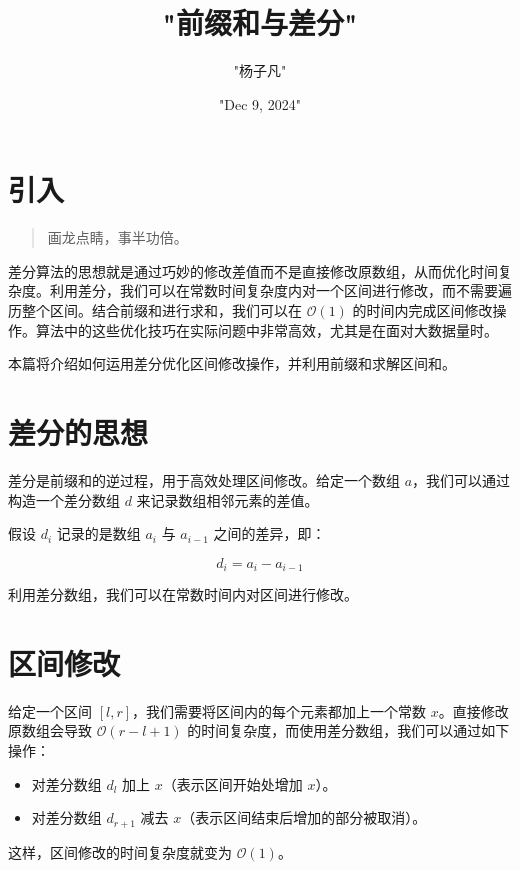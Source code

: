 \title{"前缀和与差分"}
\author{"杨子凡"}
\date{"Dec 9, 2024"}
\maketitle
\section{引入}
\begin{quote}
画龙点睛，事半功倍。\par
\end{quote}
差分算法的思想就是通过巧妙的修改差值而不是直接修改原数组，从而优化时间复杂度。利用差分，我们可以在常数时间复杂度内对一个区间进行修改，而不需要遍历整个区间。结合前缀和进行求和，我们可以在 $\mathcal{O}(1)$ 的时间内完成区间修改操作。算法中的这些优化技巧在实际问题中非常高效，尤其是在面对大数据量时。\par
本篇将介绍如何运用差分优化区间修改操作，并利用前缀和求解区间和。\par
\thematic
\section{差分的思想}
差分是前缀和的逆过程，用于高效处理区间修改。给定一个数组 $a$，我们可以通过构造一个差分数组 $d$ 来记录数组相邻元素的差值。\par
假设 $d_i$ 记录的是数组 $a_i$ 与 $a_{i-1}$ 之间的差异，即：\par
$$d_i=a_i-a_{i-1}$$\par
利用差分数组，我们可以在常数时间内对区间进行修改。\par
\section{区间修改}
给定一个区间 $[l, r]$，我们需要将区间内的每个元素都加上一个常数 $x$。直接修改原数组会导致 $\mathcal{O}(r-l+1)$ 的时间复杂度，而使用差分数组，我们可以通过如下操作：\par
\begin{itemize}
\item 对差分数组 $d_l$ 加上 $x$（表示区间开始处增加 $x$）。
\item 对差分数组 $d_{r+1}$ 减去 $x$（表示区间结束后增加的部分被取消）。
\end{itemize}
这样，区间修改的时间复杂度就变为 $\mathcal{O}(1)$。\par
\thematic
